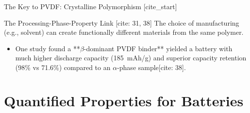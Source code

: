 \documentclass[aspectratio=169]{beamer}
\begin{document}
\begin{frame}{The Key to PVDF: Crystalline Polymorphism}
    [cite_start]\begin{exampleblock}{The Processing-Phase-Property Link [cite: 31, 38]}
        The choice of manufacturing (e.g., solvent) can create functionally different materials from the same polymer.
        \begin{itemize}
            [cite_start]\item One study found a **$\beta$-dominant PVDF binder** yielded a battery with much higher discharge capacity (\SI{185}{mAh/g}) and superior capacity retention (98\% vs 71.6\%) compared to an $\alpha$-phase sample[cite: 38].
        \end{itemize}
    \end{exampleblock}
\end{frame}

\section{Quantified Properties for Batteries}
\end{document}
